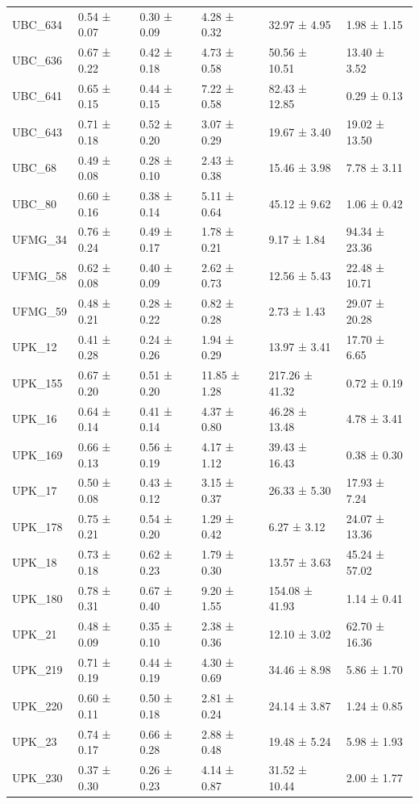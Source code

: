 \begin{tabular}{llllll}
UBC_634 & 0.54 ± 0.07 & 0.30 ± 0.09 & 4.28 ± 0.32 & 32.97 ± 4.95 & 1.98 ± 1.15 \\
UBC_636 & 0.67 ± 0.22 & 0.42 ± 0.18 & 4.73 ± 0.58 & 50.56 ± 10.51 & 13.40 ± 3.52 \\
UBC_641 & 0.65 ± 0.15 & 0.44 ± 0.15 & 7.22 ± 0.58 & 82.43 ± 12.85 & 0.29 ± 0.13 \\
UBC_643 & 0.71 ± 0.18 & 0.52 ± 0.20 & 3.07 ± 0.29 & 19.67 ± 3.40 & 19.02 ± 13.50 \\
UBC_68 & 0.49 ± 0.08 & 0.28 ± 0.10 & 2.43 ± 0.38 & 15.46 ± 3.98 & 7.78 ± 3.11 \\
UBC_80 & 0.60 ± 0.16 & 0.38 ± 0.14 & 5.11 ± 0.64 & 45.12 ± 9.62 & 1.06 ± 0.42 \\
UFMG_34 & 0.76 ± 0.24 & 0.49 ± 0.17 & 1.78 ± 0.21 & 9.17 ± 1.84 & 94.34 ± 23.36 \\
UFMG_58 & 0.62 ± 0.08 & 0.40 ± 0.09 & 2.62 ± 0.73 & 12.56 ± 5.43 & 22.48 ± 10.71 \\
UFMG_59 & 0.48 ± 0.21 & 0.28 ± 0.22 & 0.82 ± 0.28 & 2.73 ± 1.43 & 29.07 ± 20.28 \\
UPK_12 & 0.41 ± 0.28 & 0.24 ± 0.26 & 1.94 ± 0.29 & 13.97 ± 3.41 & 17.70 ± 6.65 \\
UPK_155 & 0.67 ± 0.20 & 0.51 ± 0.20 & 11.85 ± 1.28 & 217.26 ± 41.32 & 0.72 ± 0.19 \\
UPK_16 & 0.64 ± 0.14 & 0.41 ± 0.14 & 4.37 ± 0.80 & 46.28 ± 13.48 & 4.78 ± 3.41 \\
UPK_169 & 0.66 ± 0.13 & 0.56 ± 0.19 & 4.17 ± 1.12 & 39.43 ± 16.43 & 0.38 ± 0.30 \\
UPK_17 & 0.50 ± 0.08 & 0.43 ± 0.12 & 3.15 ± 0.37 & 26.33 ± 5.30 & 17.93 ± 7.24 \\
UPK_178 & 0.75 ± 0.21 & 0.54 ± 0.20 & 1.29 ± 0.42 & 6.27 ± 3.12 & 24.07 ± 13.36 \\
UPK_18 & 0.73 ± 0.18 & 0.62 ± 0.23 & 1.79 ± 0.30 & 13.57 ± 3.63 & 45.24 ± 57.02 \\
UPK_180 & 0.78 ± 0.31 & 0.67 ± 0.40 & 9.20 ± 1.55 & 154.08 ± 41.93 & 1.14 ± 0.41 \\
UPK_21 & 0.48 ± 0.09 & 0.35 ± 0.10 & 2.38 ± 0.36 & 12.10 ± 3.02 & 62.70 ± 16.36 \\
UPK_219 & 0.71 ± 0.19 & 0.44 ± 0.19 & 4.30 ± 0.69 & 34.46 ± 8.98 & 5.86 ± 1.70 \\
UPK_220 & 0.60 ± 0.11 & 0.50 ± 0.18 & 2.81 ± 0.24 & 24.14 ± 3.87 & 1.24 ± 0.85 \\
UPK_23 & 0.74 ± 0.17 & 0.66 ± 0.28 & 2.88 ± 0.48 & 19.48 ± 5.24 & 5.98 ± 1.93 \\
UPK_230 & 0.37 ± 0.30 & 0.26 ± 0.23 & 4.14 ± 0.87 & 31.52 ± 10.44 & 2.00 ± 1.77 \\

\end{tabular}
